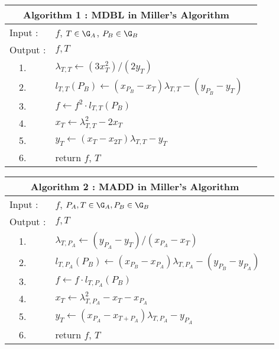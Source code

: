 \begin{center}
\begin{table}[h]
{
\label{table1}
\begin{center}
\begin{tabular}{llc}
\multicolumn{2}{c}{\bf Algorithm 1 : MDBL in Miller's Algorithm}\\
\hline\hline
Input : & $f$, $T\in \G_A$, $P_B\in \G_B$\\
Output : & $f,T$\\
\hline
\ \ 1. &$\lambda _{T,T} \leftarrow (3x_{T}^2)/(2y_{T})$ \\
\ \ 2. &$l_{T,T}(P_B) \leftarrow (x_{P_B}-x_{T})\lambda _{T,T}- (y_{P_B}-y_{T})$\\
\ \ 3. &$f\leftarrow f^2\cdot l_{T,T}(P_B)$ \\
\ \ 4. &$x_{T} \leftarrow \lambda _{T,T}^2-2x_{T}$\\
\ \ 5. &$y_{T} \leftarrow (x_{T}-x_{2T})\lambda _{T,T}-y_{T}$\\
\ \ 6. &return $f$, $T$\\
\hline\hline
\end{tabular}%
\end{center}
}
\end{table}
\end{center}
\begin{center}
\begin{table}[h]
\label{table2}
\begin{center}
\begin{tabular}{llc}
\multicolumn{2}{c}{\bf Algorithm 2 : MADD in Miller's Algorithm}\\ 
\hline\hline
Input : & $f$, $P_A,T\in \G_A, P_B\in \G_B$\\
Output : & $f,T$\\
\hline
\ \ 1. &$\lambda _{T,P_A} \leftarrow (y_{P_A}-y_{T})/(x_{P_A}-x_{T})$ \\
\ \ 2. &$l_{T,P_A}(P_B) \leftarrow (x_{P_B}-x_{P_A})\lambda _{T,P_A}- (y_{P_B}-y_{P_A})$\\
\ \ 3. &$f\leftarrow f\cdot l_{T,P_A}(P_B)$ \\
\ \ 4. &$x_{T} \leftarrow \lambda _{T,P_A}^2-x_{T}-x_{P_A}$\\
\ \ 5. &$y_{T} \leftarrow (x_{P_A}-x_{T+P_A})\lambda _{T,P_A}-y_{P_A}$\\
\ \ 6. &return $f$, $T$\\
\hline\hline
\end{tabular}%
\end{center}
\end{table}
\end{center}
